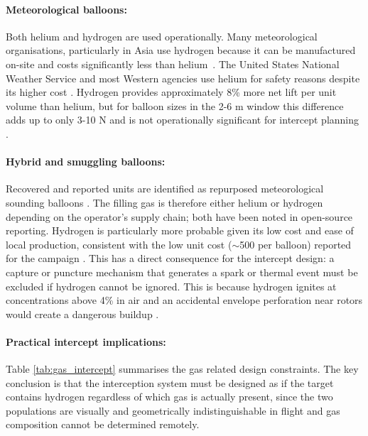 \paragraph{Meteorological balloons:}
Both helium and hydrogen are used operationally. Many meteorological organisations, particularly in Asia use hydrogen because it can be manufactured on-site and costs significantly less than helium~\cite{NOAANationalWeatherService2024RadiosondeSheet, OfficeoftheFederalCoordinatorforMeteorology1997FederalObservations, WorldMeteorologicalOrganization2018GuideGuide, HighAltitudeScienceIntroBalloons}. The United States National Weather Service and most Western
agencies use helium for safety reasons despite its higher
cost \cite{Krauchi2016ReturnMeasurements}. Hydrogen provides approximately 8\% more net lift per unit volume than helium, but for balloon sizes in the 2-6 m window this difference adds up to only 3-10 N and is not operationally significant for
intercept planning \cite{NOAANationalWeatherService2024RadiosondeSheet, WorldMeteorologicalOrganization2018GuideGuide}.
 \vspace{-10pt}

\paragraph{Hybrid and smuggling balloons:}
Recovered and reported units are identified as repurposed meteorological sounding balloons \cite{WTAQ2025Factbox:Lithuania}. The filling gas is therefore either helium or hydrogen depending on the operator's supply chain; both have been noted in open-source reporting. Hydrogen is particularly more probable given its low cost and ease of local production, consistent with the low unit cost (\texteuro{}$\sim$500 per balloon) reported
for the campaign \cite{RFE/RLBelarusService2025UpBoth}. This has a direct consequence for the intercept design: a capture or puncture mechanism that generates a spark or thermal event must be excluded if hydrogen cannot be ignored. This is because hydrogen ignites at concentrations above 4\% in air and an accidental envelope perforation near rotors would create a dangerous buildup \cite{NOAANationalWeatherService2024RadiosondeSheet, WorldMeteorologicalOrganization2018GuideGuide}.
\vspace{-10pt}

\paragraph{Practical intercept implications:}
Table \ref{tab:gas_intercept} summarises the gas related design constraints. The key conclusion is that the interception system must be designed as if the target contains hydrogen regardless of which gas is actually present, since the two populations are visually and geometrically indistinguishable in flight and gas composition cannot be determined remotely.
 
